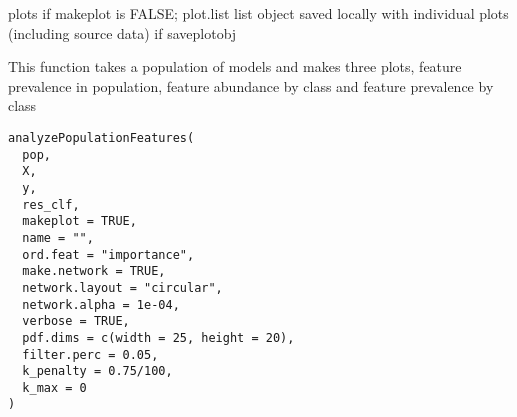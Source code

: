 \documentclass[a4paper]{book}
\begin{document}
%
\begin{Value}
plots if makeplot is FALSE; plot.list list object saved locally with individual plots (including source data) if saveplotobj
\end{Value}
%
\begin{Description}
This function takes a population of models and makes three plots, feature prevalence in population, 
feature abundance by class and feature prevalence by class
\end{Description}
%
\begin{Usage}
\begin{verbatim}
analyzePopulationFeatures(
  pop,
  X,
  y,
  res_clf,
  makeplot = TRUE,
  name = "",
  ord.feat = "importance",
  make.network = TRUE,
  network.layout = "circular",
  network.alpha = 1e-04,
  verbose = TRUE,
  pdf.dims = c(width = 25, height = 20),
  filter.perc = 0.05,
  k_penalty = 0.75/100,
  k_max = 0
)
\end{verbatim}
\end{Usage}
%
\end{document}
